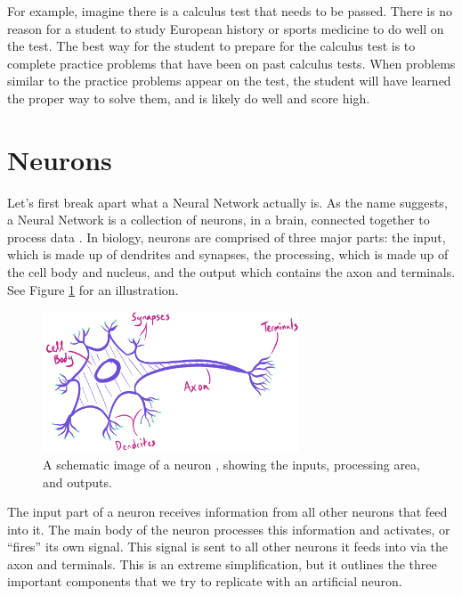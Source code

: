 \documentclass[12pt]{report}
\begin{document}
For example, imagine there is a calculus test that needs to be passed.
There is no reason for a student to study European history or sports medicine to do well on the test.
The best way for the student to prepare for the calculus test is to complete practice problems that have been on past calculus tests.
When problems similar to the practice problems appear on the test, the student will have learned the proper way to solve them, and is likely do well and score high.

\section{Neurons}
Let's first break apart what a Neural Network actually is. As the name suggests, a Neural Network is a collection of neurons, in a brain, connected together to process data \cite{mehlig2019artificial}.
In biology, neurons are comprised of three major parts: the input, which is made up of dendrites and synapses, the processing, which is made up of the cell body and nucleus, and the output which contains the axon and terminals.
See Figure \ref{bioneuron} for an illustration.
\begin{figure}[hbt!]
    \centering
    \includegraphics[width=3in]{figures/bioneuron.PNG}
    \caption{A schematic image of a neuron \cite{mehlig2019artificial}, showing the inputs, processing area, and outputs.}
    \label{bioneuron}
\end{figure}
The input part of a neuron receives information from all other neurons that feed into it. The main body of the neuron processes this information and activates, or ``fires'' its own signal. This signal is sent to all other neurons it feeds into via the axon and terminals. This is an extreme simplification, but it outlines the three important components that we try to replicate with an artificial neuron.
\end{document}
